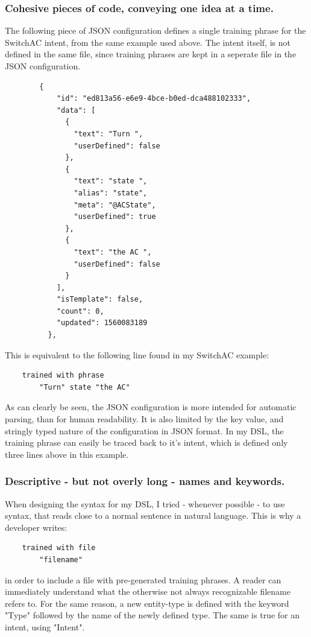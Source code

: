\subsubsection{Cohesive pieces of code, conveying one idea at a time.}

The following piece of JSON configuration defines a single training phrase for the SwitchAC intent, from the same example used above. The intent itself, is not defined in the same file, since training phrases are kept in a seperate file in the JSON configuration.
\begin{samepage}
    \begin{verbatim}
        {
            "id": "ed813a56-e6e9-4bce-b0ed-dca488102333",
            "data": [
              {
                "text": "Turn ",
                "userDefined": false
              },
              {
                "text": "state ",
                "alias": "state",
                "meta": "@ACState",
                "userDefined": true
              },
              {
                "text": "the AC ",
                "userDefined": false
              }
            ],
            "isTemplate": false,
            "count": 0,
            "updated": 1560083189
          },
    \end{verbatim}
\end{samepage}

This is equivalent to the following line found in my SwitchAC example:
\begin{verbatim}
    trained with phrase
        "Turn" state "the AC"
\end{verbatim}
As can clearly be seen, the JSON configuration is more intended for automatic parsing, than for human readability. It is also limited by the key value, and stringly typed nature of the configuration in JSON format. In my DSL, the training phrase can easily be traced back to it's intent, which is defined only three lines above in this example.

\subsubsection{Descriptive - but not overly long - names and keywords.}

When designing the syntax for my DSL, I tried - whenever possible - to use syntax, that reads close to a normal sentence in natural language. This is why a developer writes: 
\begin{verbatim}
    trained with file
        "filename"
\end{verbatim}
in order to include a file with pre-generated training phrases. A reader can immediately understand what the otherwise not always recognizable filename refers to.
For the same reason, a new entity-type is defined with the keyword "Type" followed by the name of the newly defined type. The same is true for an intent, using "Intent".

